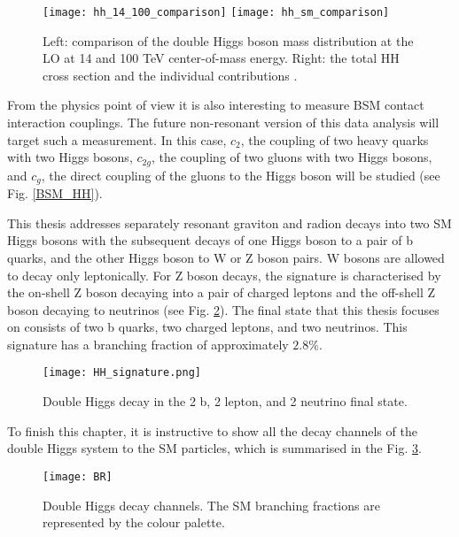  
 

\begin{figure}[H]
  \centering 
    \texttt{[image: hh\_14\_100\_comparison]}
    \texttt{[image: hh\_sm\_comparison]}
    \caption[Double Higgs mass distribution and the total cross-section]{Left: comparison of the double Higgs boson mass distribution at the LO at 14 and 100 TeV center-of-mass energy. Right: the total HH cross section and the individual contributions \cite{Contino:2012xk}.}
    \label{hh_comparison}
\end{figure}


From the physics point of view it is also interesting to measure BSM contact interaction couplings. The future non-resonant version of this data analysis will target such a measurement. In this case, $c_2$, the coupling of two heavy quarks with two Higgs bosons, $c_{2g}$, the coupling of two gluons with two Higgs bosons, and $c_g$, the direct coupling of the gluons to the Higgs boson will be studied (see Fig. \ref{BSM_HH}). 



This thesis addresses separately resonant graviton and radion decays into two SM Higgs bosons with the subsequent decays of one Higgs boson to a pair of b quarks, and the other Higgs boson to W or Z boson pairs. W bosons are allowed to decay only leptonically. For Z boson decays, the signature is characterised by the on-shell Z boson decaying into a pair of charged leptons and the off-shell Z boson decaying to neutrinos (see Fig. \ref{HH_signature}). The final state that this thesis focuses on consists of two b quarks, two charged leptons, and two neutrinos. This signature has a branching fraction of approximately $2.8 \%$. 

\begin{figure}[H]
  \centering
    \texttt{[image: HH\_signature.png]}
    \caption{Double Higgs decay in the 2 b, 2 lepton, and 2 neutrino final state. }
    \label{HH_signature}
\end{figure}

To finish this chapter, it is instructive to show all the decay channels of the double Higgs system to the SM particles, which is summarised in the Fig. \ref{BR}. 

\begin{figure}[H]
  \centering
    \texttt{[image: BR]}
    \caption[Double Higgs decay channels]{Double Higgs decay channels. The SM branching fractions are represented by the colour palette.}
    \label{BR}
\end{figure}



